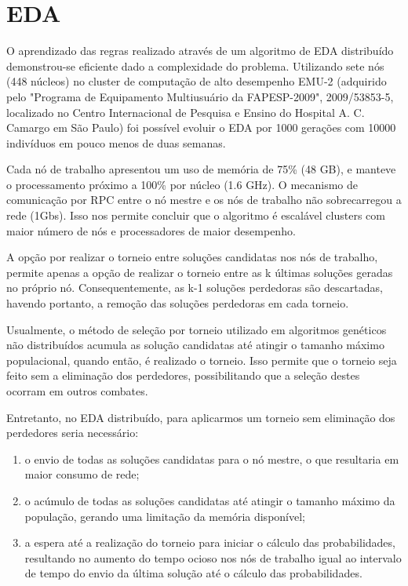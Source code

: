 \section{EDA}

O aprendizado das regras realizado através de um algoritmo de EDA distribuído demonstrou-se eficiente dado a complexidade do problema. Utilizando sete nós (448 núcleos) no cluster de computação de alto desempenho EMU-2 (adquirido pelo "Programa de Equipamento  Multiusuário da FAPESP-2009", 2009/53853-5, localizado no Centro Internacional de Pesquisa e Ensino do Hospital A. C. Camargo em  São Paulo) foi possível evoluir o EDA por 1000 gerações com 10000 indivíduos em pouco menos de duas semanas.

Cada nó de trabalho apresentou um uso de memória de 75\% (48 GB), e manteve o processamento próximo a 100\% por núcleo (1.6 GHz). O mecanismo de comunicação por RPC entre o nó mestre e os nós de trabalho não sobrecarregou a rede (1Gbs). Isso nos permite concluir que o algoritmo é escalável clusters com maior número de nós e processadores de maior desempenho.

A opção por realizar o torneio entre soluções candidatas nos nós de trabalho, permite apenas a opção de realizar o torneio entre as k últimas soluções geradas no próprio nó. Consequentemente, as k-1 soluções perdedoras são descartadas, havendo portanto, a remoção das soluções perdedoras em cada torneio. 

Usualmente, o método de seleção por torneio utilizado em algoritmos genéticos não distribuídos acumula as solução candidatas até atingir o tamanho máximo populacional, quando então, é realizado o torneio. Isso permite que o torneio seja feito sem a eliminação dos perdedores, possibilitando que a seleção destes ocorram em outros combates.

Entretanto, no EDA distribuído, para aplicarmos um torneio sem eliminação dos perdedores seria necessário:

\begin{enumerate}
	\item o envio de todas as soluções candidatas para o nó mestre, o que resultaria em maior consumo de rede;
	\item o acúmulo de todas as soluções candidatas até atingir o tamanho máximo da população, gerando uma limitação da memória disponível;
	\item a espera até a realização do torneio para iniciar o cálculo das probabilidades, resultando no aumento do tempo ocioso nos nós de trabalho igual ao intervalo de tempo do envio da última solução até o cálculo das probabilidades.
\end{enumerate} 

